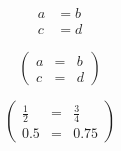 \documentclass{article}
\begin{document}
\[
\begin{aligned}
a & = b \\
c & = d
\end{aligned}
\]

\[
\begin{pmatrix}
a & = & b \\
c & = & d
\end{pmatrix}
\]

\[
\begin{pmatrix}
\frac{1}{2} & = & \frac{3}{4} \\
0.5 & = & 0.75
\end{pmatrix}
\]
\end{document}
